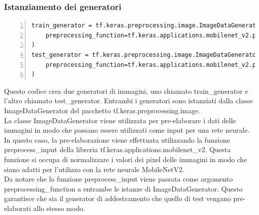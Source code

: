 \documentclass[a4paper,final,12pt]{report}
\begin{document}
\newpage
\subsubsection{Istanziamento dei generatori}
\begin{lstlisting}[caption={Istanziamento dei generatori.}, label={lst:Istanziamento_generatori}, breaklines, escapechar=`\%, frame=lines, basicstyle=\small\ttfamily, keepspaces=true, numbers=left]
train_generator = tf.keras.preprocessing.image.ImageDataGenerator(
    preprocessing_function=tf.keras.applications.mobilenet_v2.preprocess_input,
)
test_generator = tf.keras.preprocessing.image.ImageDataGenerator(
    preprocessing_function=tf.keras.applications.mobilenet_v2.preprocess_input
)
\end{lstlisting}
Questo codice crea due generatori di immagini, uno chiamato train\_generator e l'altro chiamato test\_generator. Entrambi i generatori sono istanziati dalla classe ImageDataGenerator del pacchetto tf.keras.preprocessing.image.\\
La classe ImageDataGenerator viene utilizzata per pre-elaborare i dati delle immagini in modo che possano essere utilizzati come input per una rete neurale. In questo caso, la pre-elaborazione viene effettuata utilizzando la funzione preprocess\_input della libreria tf.keras.applications.mobilenet\_v2. Questa funzione si occupa di normalizzare i valori dei pixel delle immagini in modo che siano adatti per l'utilizzo con la rete neurale MobileNetV2.\\
Da notare che la funzione preprocess\_input viene passata come argomento preprocessing\_function a entrambe le istanze di ImageDataGenerator. Questo garantisce che sia il generator di addestramento che quello di test vengano pre-elaborati allo stesso modo.\\
\end{document}

